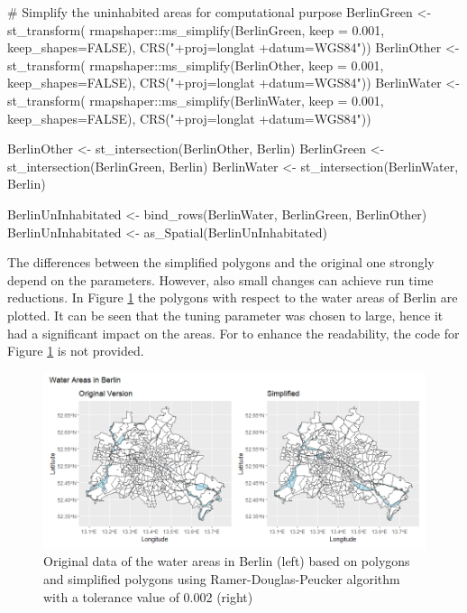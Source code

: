 \begin{example}
    # Simplify the uninhabited areas for computational purpose
    BerlinGreen <- st_transform(
      rmapshaper::ms_simplify(BerlinGreen, keep = 0.001, keep_shapes=FALSE),
                               CRS("+proj=longlat +datum=WGS84"))
    BerlinOther <- st_transform(
      rmapshaper::ms_simplify(BerlinOther, keep = 0.001, keep_shapes=FALSE),
                               CRS("+proj=longlat +datum=WGS84"))
    BerlinWater <- st_transform(
      rmapshaper::ms_simplify(BerlinWater, keep = 0.001, keep_shapes=FALSE),
                               CRS("+proj=longlat +datum=WGS84"))

    BerlinOther <- st_intersection(BerlinOther, Berlin)
    BerlinGreen <- st_intersection(BerlinGreen, Berlin)
    BerlinWater <- st_intersection(BerlinWater, Berlin)

    BerlinUnInhabitated <- bind_rows(BerlinWater, BerlinGreen, BerlinOther)
    BerlinUnInhabitated <- as_Spatial(BerlinUnInhabitated)  
   
\end{example}

The differences between the simplified polygons and the original one strongly depend on the parameters. However, also small changes can achieve run time reductions. In Figure \ref{fig:water} the polygons with respect to the water areas of Berlin are plotted. It can be seen that the tuning parameter was chosen to large, hence it had a significant impact on the areas. For to enhance the readability, the code for Figure \ref{fig:water} is not provided. 

\begin{figure}[h]
    \centering
    \includegraphics[scale = 0.55]{Figure/Water_Part2.png}
    \caption{Original data of the water areas in Berlin (left) based on polygons and simplified polygons using Ramer-Douglas-Peucker algorithm with a tolerance value of 0.002 (right)}
    \label{fig:water}
\end{figure}

